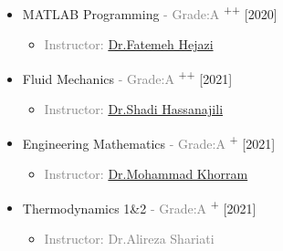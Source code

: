 \documentclass[10pt,a4paper,sans]{moderncv} %
\begin{document}
	\begin{multicols}{2}
		\begin{itemize}
			\item {} MATLAB Programming \textcolor{gray}{- Grade:A }\textsuperscript{++} \hfill[2020]
			\begin{itemize}
				\item \textcolor{gray}{Instructor: \href{https://scholar.google.com/citations?hl=en&user=SJs5rMcAAAAJ}{Dr.Fatemeh Hejazi}}


			\end{itemize}
			
			\vspace{0.5 em} 
			\item {} Fluid Mechanics  \textcolor{gray}{- Grade:A }\textsuperscript{++} \hfill[2021]
			\begin{itemize}
				\item \textcolor{gray}{Instructor: \href{https://scholar.google.com/citations?hl=en&user=h1wVb0IAAAAJ&view_op=list_works&sortby=pubdate}{Dr.Shadi Hassanajili
}}
  
			\end{itemize}
			
			\vspace{0.5 em} 

			\item {} Engineering Mathematics \textcolor{gray}{- Grade:A }\textsuperscript{+} \hfill[2021]
			\begin{itemize}
				\item \textcolor{gray}{Instructor: \href{https://scholar.google.com/citations?user=swfaYtQAAAAJ&hl=en}{Dr.Mohammad Khorram}}
				
               \vspace{0.5 em}  
  
			    \end{itemize}
			    
			\item {} Thermodynamics 1\&2 \textcolor{gray}{- Grade:A }\textsuperscript{+} \hfill[2021]
               \begin{itemize}
                \item\textcolor{gray}{Instructor: 
                {Dr.Alireza Shariati}}
                \end{itemize}


\end{itemize}
\end{multicols}
\end{document}
